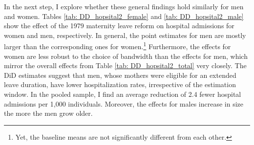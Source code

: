 \documentclass[11pt, a4paper]{article} %
\newcommand\natalia[1]{\textcolor{orange}{#1}}
\begin{document}






 
In the next step, I explore whether these general findings hold similarly for men and women. Tables \ref{tab: DD_hopsital2_female} and \ref{tab: DD_hopsital2_male} show the effect of the 1979 maternity leave reform on hospital admissions for women and men, respectively. In general, the point estimates for men are mostly larger than the corresponding ones for women.\footnote{Yet, the baseline means are not significantly different from each other.} Furthermore, the effects for women are less robust to the choice of bandwidth than the effects for men, which mirror the overall effects from Table \ref{tab: DD_hopsital2_total} very closely. The DiD estimates suggest that men, whose mothers were eligible for an extended leave duration, have lower hospitalization rates, irrespective of the estimation window. In the pooled sample, I find an average reduction of 2.4 fewer hospital admissions per 1,000 individuals. Moreover, the effects for males increase in size the more the men grow older. 
\end{document}
